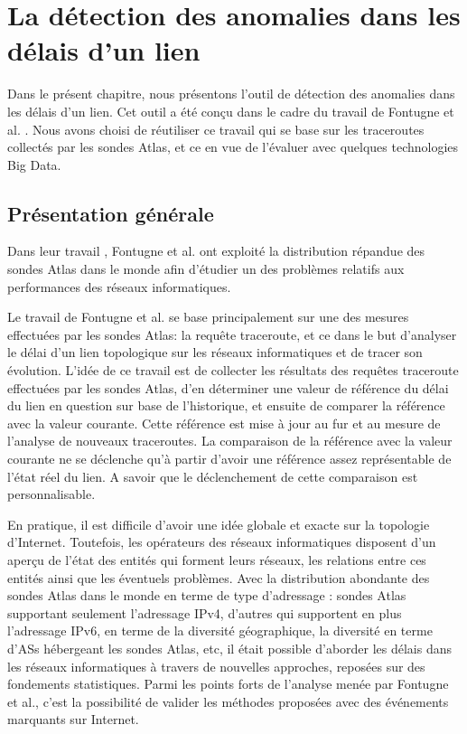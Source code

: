 \chapter{La détection des anomalies dans les délais d'un lien} \label{chap:algorith-detection}

Dans le présent chapitre, nous présentons l'outil de détection des anomalies dans les délais d'un lien. Cet outil a été  conçu dans le cadre du travail   de  Fontugne et al. \cite{DBLP:journals/corr/FontugneAPB16}. Nous avons choisi de réutiliser ce travail qui se base sur les traceroutes collectés par les sondes Atlas, et ce en vue de l'évaluer avec quelques technologies  Big Data.   

\section{Présentation générale }

Dans leur travail \cite{DBLP:journals/corr/FontugneAPB16}, Fontugne et al. ont exploité la  distribution répandue des sondes Atlas dans le monde afin d'étudier un des problèmes relatifs aux performances des réseaux informatiques. 

Le travail de  Fontugne  et al. \cite{DBLP:journals/corr/FontugneAPB16} se base principalement sur une des mesures effectuées par les sondes Atlas: la requête traceroute, et ce dans le but  d'analyser le délai d'un lien topologique sur les réseaux informatiques et de tracer son évolution. L'idée de ce travail est de collecter les résultats des requêtes traceroute effectuées par les sondes Atlas, d'en déterminer une valeur de référence du délai du lien en question sur base de l'historique, et ensuite de comparer la référence avec la valeur courante.  Cette référence est mise à jour au fur et au mesure de l'analyse de nouveaux traceroutes. 
La comparaison de la référence avec la valeur courante ne se déclenche qu'à partir d'avoir une référence assez représentable de l'état réel du lien. A savoir que le déclenchement de cette comparaison  est personnalisable.





En pratique, il est  difficile  d'avoir une idée globale et exacte sur la topologie d'Internet. Toutefois, les opérateurs des réseaux informatiques  disposent d'un aperçu de l'état des entités qui forment leurs réseaux, les relations entre ces entités ainsi que les éventuels problèmes. Avec la distribution abondante des sondes Atlas dans le monde en terme de type d'adressage : sondes Atlas supportant seulement l'adressage IPv4, d'autres qui supportent en plus l'adressage IPv6, en terme de  la diversité géographique, la diversité en terme d'ASs hébergeant les sondes Atlas, etc, il était  possible d'aborder  les délais dans les réseaux informatiques à travers de nouvelles approches, reposées sur des fondements statistiques. Parmi les points forts de l'analyse menée par  Fontugne et al., c'est la possibilité de valider les   méthodes proposées avec des événements  marquants sur Internet.

